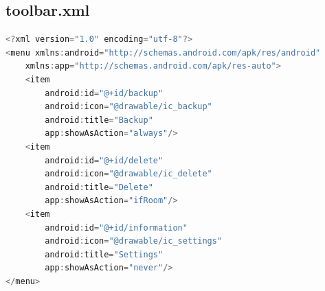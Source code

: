 \documentclass[UTF8, Microsoft YaHei]{book}
\begin{document}
    \subsection{toolbar.xml}
\begin{small}
\begin{lstlisting}[language=java]
<?xml version="1.0" encoding="utf-8"?>
<menu xmlns:android="http://schemas.android.com/apk/res/android"
    xmlns:app="http://schemas.android.com/apk/res-auto">
    <item
        android:id="@+id/backup"
        android:icon="@drawable/ic_backup"
        android:title="Backup"
        app:showAsAction="always"/>
    <item
        android:id="@+id/delete"
        android:icon="@drawable/ic_delete"
        android:title="Delete"
        app:showAsAction="ifRoom"/>
    <item
        android:id="@+id/information"
        android:icon="@drawable/ic_settings"
        android:title="Settings"
        app:showAsAction="never"/>
</menu>
\end{lstlisting}
\end{small}
\end{document}
